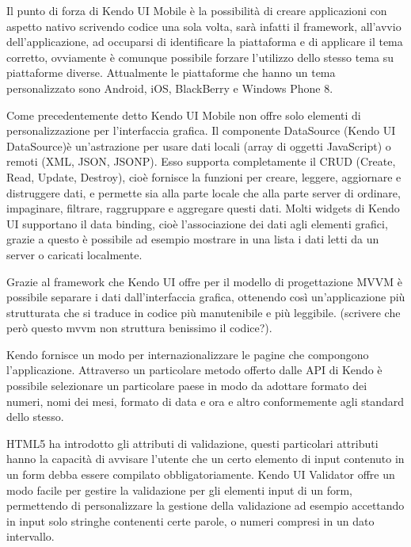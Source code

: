 			Il punto di forza di Kendo UI Mobile è la 
			possibilità di creare applicazioni con aspetto nativo scrivendo codice 
			una sola volta, sarà infatti il framework, all'avvio dell'applicazione,
			ad occuparsi di identificare la piattaforma e di applicare il tema corretto, 
			ovviamente è comunque possibile forzare l'utilizzo dello stesso tema 
			su piattaforme diverse. Attualmente le piattaforme che hanno un tema 
			personalizzato sono Android, iOS, BlackBerry e Windows Phone 8.
			
			Come precedentemente detto Kendo UI Mobile non offre solo elementi di 
			personalizzazione per l'interfaccia grafica.
			Il componente DataSource (Kendo UI DataSource)è un'astrazione per usare dati locali (array
			di oggetti JavaScript) o remoti (XML, JSON, JSONP). Esso supporta 
			completamente il CRUD (Create, Read, Update, Destroy), cioè fornisce
			la funzioni per creare, leggere, aggiornare e distruggere dati, e  
			permette sia alla parte locale che alla parte server di ordinare,
			impaginare, filtrare, raggruppare e aggregare questi dati.
			Molti widgets di Kendo UI supportano il data binding, cioè l'associazione
			dei dati agli elementi grafici, grazie a questo è possibile ad esempio
			mostrare in una lista i dati letti da un server o caricati localmente.

			Grazie al framework che Kendo UI offre per il modello di progettazione
			MVVM è possibile separare i dati dall'interfaccia grafica, ottenendo 
			così un'applicazione più strutturata che si traduce in codice 
			più manutenibile e più leggibile. (scrivere che però questo mvvm  
			non struttura benissimo il codice?).
			
			Kendo fornisce un modo per internazionalizzare le pagine che 
			compongono l'applicazione. Attraverso un particolare metodo offerto
			dalle API di Kendo è possibile selezionare un particolare paese in 
			modo da adottare formato dei numeri, nomi dei mesi, formato 
			di data e ora e altro conformemente agli standard dello stesso.
	
			HTML5 ha introdotto gli attributi di validazione, questi particolari 
			attributi hanno la capacità di avvisare l'utente che un certo elemento
			di input contenuto in un form debba essere compilato obbligatoriamente.
			Kendo UI Validator offre un modo facile per gestire la validazione 
			per gli elementi input di un form, permettendo di personalizzare la 
			gestione della validazione ad esempio accettando in input solo stringhe 
			contenenti certe parole, o numeri compresi in un dato intervallo.
			

